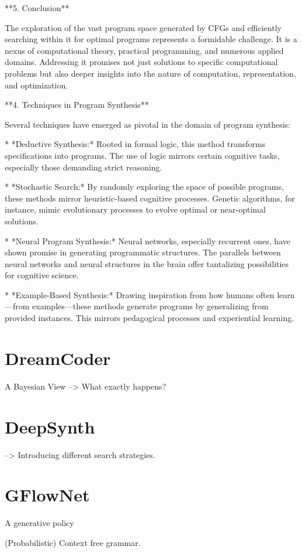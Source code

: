 **5. Conclusion**

The exploration of the vast program space generated by CFGs and efficiently searching within it for optimal programs represents a formidable challenge. It is a nexus of computational theory, practical programming, and numerous applied domains. Addressing it promises not just solutions to specific computational problems but also deeper insights into the nature of computation, representation, and optimization.

**4. Techniques in Program Synthesis**

Several techniques have emerged as pivotal in the domain of program synthesis:

* *Deductive Synthesis:* Rooted in formal logic, this method transforms specifications into programs. The use of logic mirrors certain cognitive tasks, especially those demanding strict reasoning.

* *Stochastic Search:* By randomly exploring the space of possible programs, these methods mirror heuristic-based cognitive processes. Genetic algorithms, for instance, mimic evolutionary processes to evolve optimal or near-optimal solutions.

* *Neural Program Synthesis:* Neural networks, especially recurrent ones, have shown promise in generating programmatic structures. The parallels between neural networks and neural structures in the brain offer tantalizing possibilities for cognitive science.

* *Example-Based Synthesis:* Drawing inspiration from how humans often learn—from examples—these methods generate programs by generalizing from provided instances. This mirrors pedagogical processes and experiential learning.



\section{DreamCoder}
A Bayesian View
--> What exactly happens?
\section{DeepSynth}
--> Introducing different search strategies.
\section{GFlowNet}
A generative policy




(Probabilistic) Context free grammar. 
